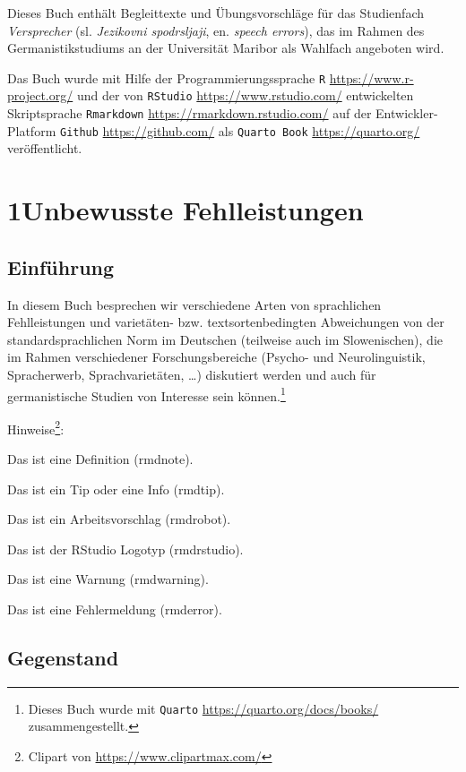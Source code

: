\documentclass[
  letterpaper,
]{scrbook}
\begin{document}

Dieses Buch enthält Begleittexte und Übungsvorschläge für das
Studienfach \emph{Versprecher} (sl. \emph{Jezikovni spodrsljaji}, en.
\emph{speech errors}), das im Rahmen des Germanistikstudiums an der
Universität Maribor als Wahlfach angeboten wird.

Das Buch wurde mit Hilfe der Programmierungssprache \texttt{R}
\url{https://www.r-project.org/} und der von \texttt{RStudio}
\url{https://www.rstudio.com/} entwickelten Skriptsprache
\texttt{Rmarkdown} \url{https://rmarkdown.rstudio.com/} auf der
Entwickler-Platform \texttt{Github} \url{https://github.com/} als
\texttt{Quarto\ Book} \url{https://quarto.org/} veröffentlicht.

\part{1Unbewusste Fehlleistungen}

\hypertarget{sec-einfuhrung}{%
\chapter{Einführung}\label{sec-einfuhrung}}

In diesem Buch besprechen wir verschiedene Arten von sprachlichen
Fehlleistungen und varietäten- bzw. textsortenbedingten Abweichungen von
der standardsprachlichen Norm im Deutschen (teilweise auch im
Slowenischen), die im Rahmen verschiedener Forschungsbereiche (Psycho-
und Neurolinguistik, Spracherwerb, Sprachvarietäten, \ldots) diskutiert
werden und auch für germanistische Studien von Interesse sein
können.\footnote{Dieses Buch wurde mit \texttt{Quarto}
  \url{https://quarto.org/docs/books/} zusammengestellt.}

Hinweise\footnote{Clipart von \url{https://www.clipartmax.com/}}:

Das ist eine Definition (rmdnote).

Das ist ein Tip oder eine Info (rmdtip).

Das ist ein Arbeitsvorschlag (rmdrobot).

Das ist der RStudio Logotyp (rmdrstudio).

Das ist eine Warnung (rmdwarning).

Das ist eine Fehlermeldung (rmderror).

\hypertarget{sec-gegenstand}{%
\chapter{Gegenstand}\label{sec-gegenstand}}
\end{document}
